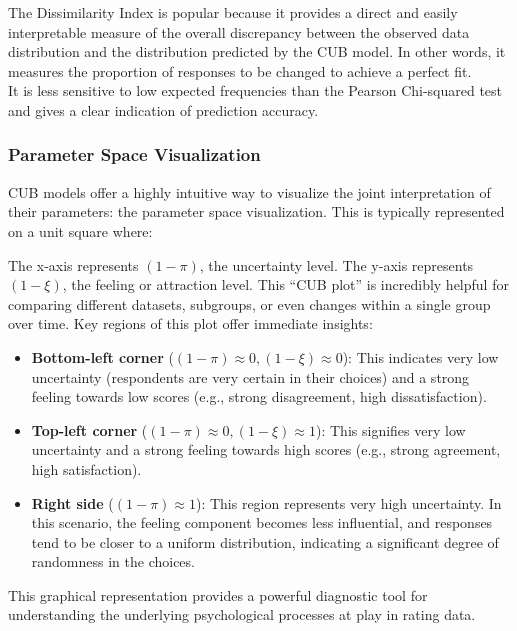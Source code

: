 \documentclass[
  letterpaper,
  DIV=11,
  numbers=noendperiod]{scrartcl}
\begin{document}
The Dissimilarity Index is popular because it provides a direct and
easily interpretable measure of the overall discrepancy between the
observed data distribution and the distribution predicted by the CUB
model. In other words, it measures the proportion of responses to be
changed to achieve a perfect fit.\\
It is less sensitive to low expected frequencies than the Pearson
Chi-squared test and gives a clear indication of prediction accuracy.

\hypertarget{parameter-space-visualization}{%
\subsubsection{Parameter Space
Visualization}\label{parameter-space-visualization}}

CUB models offer a highly intuitive way to visualize the joint
interpretation of their parameters: the parameter space visualization.
This is typically represented on a unit square where:

The x-axis represents \((1−\pi)\), the uncertainty level. The y-axis
represents \((1−\xi)\), the feeling or attraction level. This ``CUB
plot'' is incredibly helpful for comparing different datasets,
subgroups, or even changes within a single group over time. Key regions
of this plot offer immediate insights:

\begin{itemize}
\item
  \textbf{Bottom-left corner} (\((1−\pi)\approx0,(1−\xi)\approx0\)):
  This indicates very low uncertainty (respondents are very certain in
  their choices) and a strong feeling towards low scores (e.g., strong
  disagreement, high dissatisfaction).
\item
  \textbf{Top-left corner} (\((1−\pi)\approx0,(1−\xi)\approx1\)): This
  signifies very low uncertainty and a strong feeling towards high
  scores (e.g., strong agreement, high satisfaction).
\item
  \textbf{Right side} (\((1−\pi)\approx1\)): This region represents very
  high uncertainty. In this scenario, the feeling component becomes less
  influential, and responses tend to be closer to a uniform
  distribution, indicating a significant degree of randomness in the
  choices.
\end{itemize}

This graphical representation provides a powerful diagnostic tool for
understanding the underlying psychological processes at play in rating
data.
\end{document}
